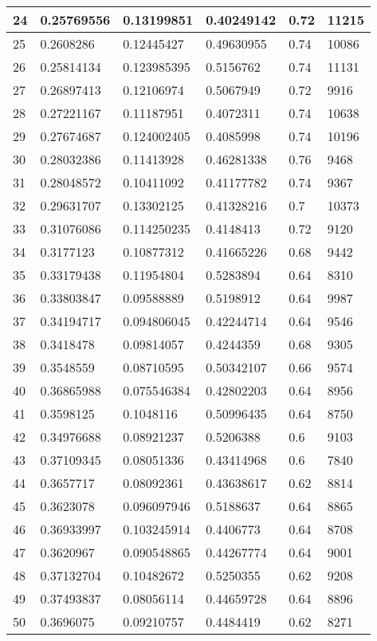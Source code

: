 \begin{longtable}{|l|l|l|l|l|l|}
24 & 0.25769556 & 0.13199851 & 0.40249142 & 0.72 & 11215 \\ \hline 
25 & 0.2608286 & 0.12445427 & 0.49630955 & 0.74 & 10086 \\ \hline 
26 & 0.25814134 & 0.123985395 & 0.5156762 & 0.74 & 11131 \\ \hline 
27 & 0.26897413 & 0.12106974 & 0.5067949 & 0.72 & 9916 \\ \hline 
28 & 0.27221167 & 0.11187951 & 0.4072311 & 0.74 & 10638 \\ \hline 
29 & 0.27674687 & 0.124002405 & 0.4085998 & 0.74 & 10196 \\ \hline 
30 & 0.28032386 & 0.11413928 & 0.46281338 & 0.76 & 9468 \\ \hline 
31 & 0.28048572 & 0.10411092 & 0.41177782 & 0.74 & 9367 \\ \hline 
32 & 0.29631707 & 0.13302125 & 0.41328216 & 0.7 & 10373 \\ \hline 
33 & 0.31076086 & 0.114250235 & 0.4148413 & 0.72 & 9120 \\ \hline 
34 & 0.3177123 & 0.10877312 & 0.41665226 & 0.68 & 9442 \\ \hline 
35 & 0.33179438 & 0.11954804 & 0.5283894 & 0.64 & 8310 \\ \hline 
36 & 0.33803847 & 0.09588889 & 0.5198912 & 0.64 & 9987 \\ \hline 
37 & 0.34194717 & 0.094806045 & 0.42244714 & 0.64 & 9546 \\ \hline 
38 & 0.3418478 & 0.09814057 & 0.4244359 & 0.68 & 9305 \\ \hline 
39 & 0.3548559 & 0.08710595 & 0.50342107 & 0.66 & 9574 \\ \hline 
40 & 0.36865988 & 0.075546384 & 0.42802203 & 0.64 & 8956 \\ \hline 
41 & 0.3598125 & 0.1048116 & 0.50996435 & 0.64 & 8750 \\ \hline 
42 & 0.34976688 & 0.08921237 & 0.5206388 & 0.6 & 9103 \\ \hline 
43 & 0.37109345 & 0.08051336 & 0.43414968 & 0.6 & 7840 \\ \hline 
44 & 0.3657717 & 0.08092361 & 0.43638617 & 0.62 & 8814 \\ \hline 
45 & 0.3623078 & 0.096097946 & 0.5188637 & 0.64 & 8865 \\ \hline 
46 & 0.36933997 & 0.103245914 & 0.4406773 & 0.64 & 8708 \\ \hline 
47 & 0.3620967 & 0.090548865 & 0.44267774 & 0.64 & 9001 \\ \hline 
48 & 0.37132704 & 0.10482672 & 0.5250355 & 0.62 & 9208 \\ \hline 
49 & 0.37493837 & 0.08056114 & 0.44659728 & 0.64 & 8896 \\ \hline 
50 & 0.3696075 & 0.09210757 & 0.4484419 & 0.62 & 8271 \\ \hline 
\end{longtable}